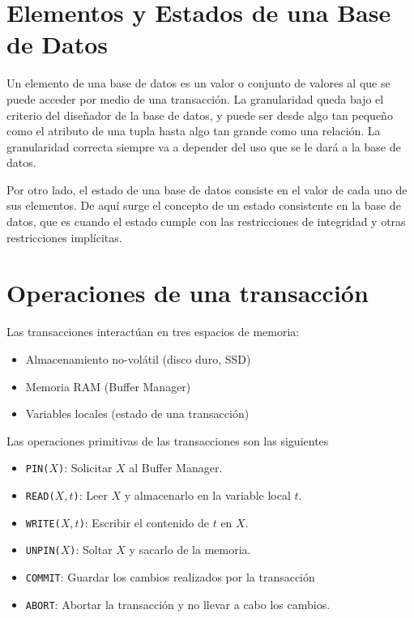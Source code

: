 \section{Elementos y Estados de una Base de Datos}
Un elemento de una base de datos es un valor o conjunto de valores al que se puede acceder por medio de una transacción. La granularidad queda bajo el criterio del diseñador de la base de datos, y puede ser desde algo tan pequeño como el atributo de una tupla hasta algo tan grande como una relación. La granularidad correcta siempre va a depender del uso que se le dará a la base de datos.

Por otro lado, el estado de una base de datos consiste en el valor de cada uno de sus elementos. De aquí surge el concepto de un estado consistente en la base de datos, que es cuando el estado cumple con las restricciones de integridad y otras restricciones implícitas.



\section{Operaciones de una transacción}
Las transacciones interactúan en tres espacios de memoria:
\begin{itemize}
  \item Almacenamiento no-volátil (disco duro, SSD)
  \item Memoria RAM (Buffer Manager)
  \item Variables locales (estado de una transacción)
\end{itemize}

Las operaciones primitivas de las transacciones son las siguientes

\begin{itemize}
  \item \texttt{PIN($X$)}: Solicitar $X$ al Buffer Manager.
  \item \texttt{READ($X, t$)}: Leer $X$ y almacenarlo en la variable local $t$.
  \item \texttt{WRITE($X, t$)}: Escribir el contenido de $t$ en $X$.
  \item \texttt{UNPIN($X$)}: Soltar $X$ y sacarlo de la memoria.
  \item \texttt{COMMIT}: Guardar los cambios realizados por la transacción
  \item \texttt{ABORT}: Abortar la transacción y no llevar a cabo los cambios.
\end{itemize}

